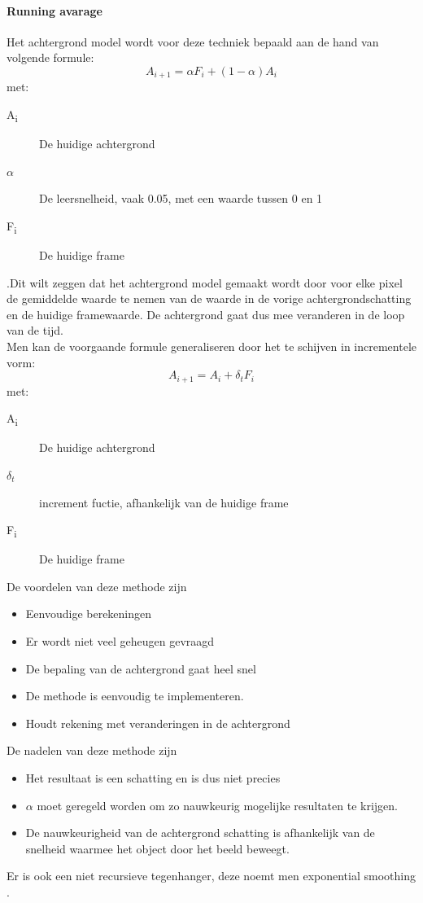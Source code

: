 \paragraph{Running avarage}
\label{refRUA}
Het achtergrond model wordt voor deze techniek bepaald aan de hand van volgende formule:
\begin{displaymath}
A_{i+1}=\alpha F_i+(1-\alpha)A_i
\end{displaymath}
met:
\begin{description}
	\item[A\textsubscript{i}] De huidige achtergrond
	\item[$\alpha$] De leersnelheid, vaak 0.05, met een waarde tussen 0 en 1
	\item[F\textsubscript{i}] De huidige frame
\end{description}
\cite{bibBEt}.Dit wilt zeggen dat het achtergrond model gemaakt wordt door voor elke pixel de gemiddelde waarde te nemen van de waarde in de vorige achtergrondschatting en de huidige framewaarde. De achtergrond gaat dus mee veranderen in de loop van de tijd. \\
Men kan de voorgaande formule generaliseren door het te schijven in incrementele vorm:
\begin{displaymath}
A_{i+1}=A_i+\delta_t F_i
\end{displaymath}
met:
\begin{description}
	\item[A\textsubscript{i}] De huidige achtergrond
	\item[$\delta_t$] increment fuctie, afhankelijk van de huidige frame
	\item[F\textsubscript{i}] De huidige frame
\end{description}
\cite{bibSDB}

De voordelen van deze methode zijn
\begin{itemize}
	\item Eenvoudige berekeningen
	\item Er wordt niet veel geheugen gevraagd
	\item De bepaling van de achtergrond gaat heel snel
	\item De methode is eenvoudig te implementeren.
	\item Houdt rekening met veranderingen in de achtergrond
\end{itemize}
De nadelen van deze methode zijn
\begin{itemize}
	\item Het resultaat is een schatting en is dus niet precies
	\item $\alpha$ moet geregeld worden om zo nauwkeurig mogelijke resultaten te krijgen.
	\item De nauwkeurigheid van de achtergrond schatting is afhankelijk van de snelheid waarmee het object door het beeld beweegt.
\end{itemize}
Er is ook een niet recursieve tegenhanger, deze noemt men exponential smoothing \cite{bibSDB}.


